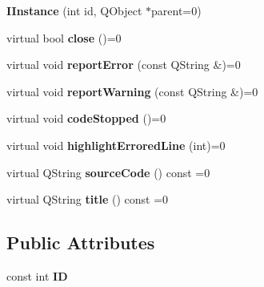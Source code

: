 \begin{DoxyCompactItemize}
\item 
\hypertarget{classInstances_1_1IInstance_aa0e6667c2b463f94edb26976f9fe0e56}{{\bfseries I\+Instance} (int id, Q\+Object $\ast$parent=0)}\label{classInstances_1_1IInstance_aa0e6667c2b463f94edb26976f9fe0e56}

\item 
\hypertarget{classInstances_1_1IInstance_ab45b5dcb803b7fc3de490a76ff359583}{virtual bool {\bfseries close} ()=0}\label{classInstances_1_1IInstance_ab45b5dcb803b7fc3de490a76ff359583}

\item 
\hypertarget{classInstances_1_1IInstance_abea7dafb6274a84bbbc58d07d8bc4072}{virtual void {\bfseries report\+Error} (const Q\+String \&)=0}\label{classInstances_1_1IInstance_abea7dafb6274a84bbbc58d07d8bc4072}

\item 
\hypertarget{classInstances_1_1IInstance_a1eab02bfd1b9acc33172ec95d2861c57}{virtual void {\bfseries report\+Warning} (const Q\+String \&)=0}\label{classInstances_1_1IInstance_a1eab02bfd1b9acc33172ec95d2861c57}

\item 
\hypertarget{classInstances_1_1IInstance_a12f7c89db4f39042b6e19594a54f5587}{virtual void {\bfseries code\+Stopped} ()=0}\label{classInstances_1_1IInstance_a12f7c89db4f39042b6e19594a54f5587}

\item 
\hypertarget{classInstances_1_1IInstance_a8cee5564d63579bcd7b878b7feaed411}{virtual void {\bfseries highlight\+Errored\+Line} (int)=0}\label{classInstances_1_1IInstance_a8cee5564d63579bcd7b878b7feaed411}

\item 
\hypertarget{classInstances_1_1IInstance_a637a26491b9efe024370716d5d295484}{virtual Q\+String {\bfseries source\+Code} () const =0}\label{classInstances_1_1IInstance_a637a26491b9efe024370716d5d295484}

\item 
\hypertarget{classInstances_1_1IInstance_ac13fdb953dda08184f7b9dcab7d0c259}{virtual Q\+String {\bfseries title} () const =0}\label{classInstances_1_1IInstance_ac13fdb953dda08184f7b9dcab7d0c259}

\end{DoxyCompactItemize}
\subsection*{Public Attributes}
\begin{DoxyCompactItemize}
\item 
\hypertarget{classInstances_1_1IInstance_a215b003cb2f0986801fa911533794b14}{const int {\bfseries I\+D}}\label{classInstances_1_1IInstance_a215b003cb2f0986801fa911533794b14}

\end{DoxyCompactItemize}
